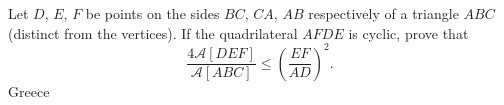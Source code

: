 Let $D$,  $E$,  $F$ be points on the sides $BC$,  $CA$,  $AB$ respectively of a triangle $ABC$ (distinct from the vertices). If the quadrilateral $AFDE$ is  cyclic, prove that \[ \frac{ 4 \mathcal A[DEF] }{\mathcal A[ABC] } \leq \left( \frac{EF}{AD} \right)^2 . \]Greece
